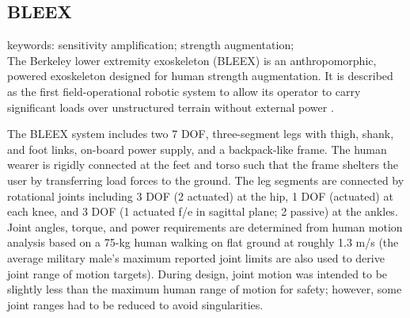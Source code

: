 






% 


\subsection{BLEEX}

keywords: sensitivity amplification; strength augmentation;\\

The Berkeley lower extremity exoskeleton (BLEEX) is an anthropomorphic, powered exoskeleton designed for human strength augmentation.  It is described as the first field-operational robotic system to allow its operator to carry significant loads over unstructured terrain without external power \cite{bleex_design_2006}.

The BLEEX system includes two 7 DOF, three-segment legs with thigh, shank, and foot links, on-board power supply, and a backpack-like frame.  The human wearer is rigidly connected at the feet and torso such that the frame shelters the user by transferring load forces to the ground.  The leg segments are connected by rotational joints including 3 DOF (2 actuated) at the hip, 1 DOF (actuated) at each knee, and 3 DOF (1 actuated f/e in sagittal 
plane; 2 passive) at the ankles.  Joint angles, torque, and power requirements are determined from human motion analysis based on a 75-kg human walking on flat ground at roughly 1.3 m/s (the average military male's maximum reported joint limits are also used to derive joint range of motion targets).  During design, joint motion was intended to be slightly less than the maximum human range of motion for safety; however, some joint ranges had to be reduced to avoid singularities.

